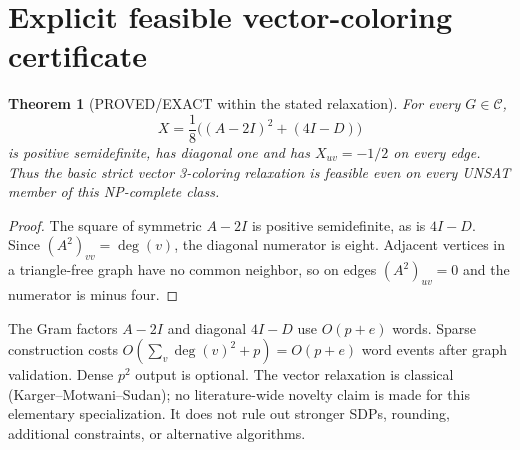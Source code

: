 \documentclass[11pt]{article}
\newtheorem{theorem}{Theorem}
\begin{document}
\section{Explicit feasible vector-coloring certificate}
\begin{theorem}[PROVED/EXACT within the stated relaxation]
For every $G\in\mathcal C$,
\[
 X=\frac18\bigl((A-2I)^2+(4I-D)\bigr)
\]
is positive semidefinite, has diagonal one and has $X_{uv}=-1/2$ on every edge. Thus the basic strict vector 3-coloring relaxation is feasible even on every UNSAT member of this NP-complete class.
\end{theorem}
\begin{proof}
The square of symmetric $A-2I$ is positive semidefinite, as is $4I-D$. Since $(A^2)_{vv}=\deg(v)$, the diagonal numerator is eight. Adjacent vertices in a triangle-free graph have no common neighbor, so on edges $(A^2)_{uv}=0$ and the numerator is minus four.
\end{proof}
The Gram factors $A-2I$ and diagonal $4I-D$ use $O(p+e)$ words. Sparse construction costs $O(\sum_v\deg(v)^2+p)=O(p+e)$ word events after graph validation. Dense $p^2$ output is optional. The vector relaxation is classical (Karger--Motwani--Sudan); no literature-wide novelty claim is made for this elementary specialization. It does not rule out stronger SDPs, rounding, additional constraints, or alternative algorithms.
\end{document}
